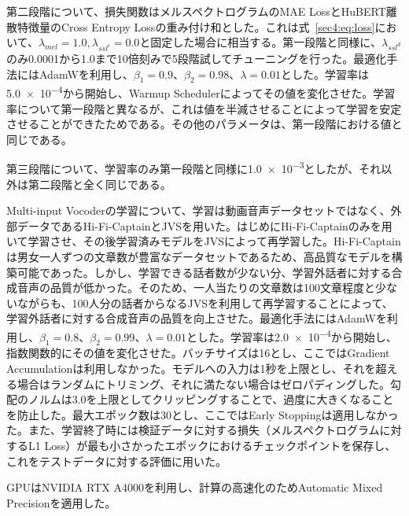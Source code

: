 \documentclass[12pt]{jarticle}
\numberwithin{equation}{section}    %
\numberwithin{figure}{section}      %
\numberwithin{table}{section}      %
\begin{document}
第二段階について、損失関数はメルスペクトログラムのMAE LossとHuBERT離散特徴量のCross Entropy Lossの重み付け和とした。これは式~\eqref{sec4:eq:loss}において、$\lambda_{mel} = 1.0, \lambda_{ssl^{i}} = 0.0$と固定した場合に相当する。第一段階と同様に、$\lambda_{ssl^{d}}$のみ0.0001から1.0まで10倍刻みで5段階試してチューニングを行った。最適化手法にはAdamWを利用し、$\beta_{1} = 0.9$、$\beta_{2} = 0.98$、$\lambda = 0.01$とした。学習率は\num{5.0e-4}から開始し、Warmup Schedulerによってその値を変化させた。学習率について第一段階と異なるが、これは値を半減させることによって学習を安定させることができたためである。その他のパラメータは、第一段階における値と同じである。

第三段階について、学習率のみ第一段階と同様に\num{1.0e-3}としたが、それ以外は第二段階と全く同じである。

Multi-input Vocoderの学習について、学習は動画音声データセットではなく、外部データであるHi-Fi-CaptainとJVSを用いた。はじめにHi-Fi-Captainのみを用いて学習させ、その後学習済みモデルをJVSによって再学習した。Hi-Fi-Captainは男女一人ずつの文章数が豊富なデータセットであるため、高品質なモデルを構築可能であった。しかし、学習できる話者数が少ない分、学習外話者に対する合成音声の品質が低かった。そのため、一人当たりの文章数は100文章程度と少ないながらも、100人分の話者からなるJVSを利用して再学習することによって、学習外話者に対する合成音声の品質を向上させた。最適化手法にはAdamWを利用し、$\beta_{1} = 0.8$、$\beta_{2} = 0.99$、$\lambda = 0.01$とした。学習率は\num{2.0e-4}から開始し、指数関数的にその値を変化させた。バッチサイズは16とし、ここではGradient Accumulationは利用しなかった。モデルへの入力は1秒を上限とし、それを超える場合はランダムにトリミング、それに満たない場合はゼロパディングした。勾配のノルムは3.0を上限としてクリッピングすることで、過度に大きくなることを防止した。最大エポック数は30とし、ここではEarly Stoppingは適用しなかった。また、学習終了時には検証データに対する損失（メルスペクトログラムに対するL1 Loss）が最も小さかったエポックにおけるチェックポイントを保存し、これをテストデータに対する評価に用いた。

GPUはNVIDIA RTX A4000を利用し、計算の高速化のためAutomatic Mixed Precisionを適用した。
\end{document}
